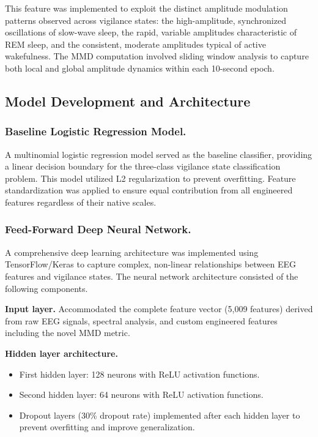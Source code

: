 \documentclass[letterpaper]{article} %
\begin{document}
This feature was implemented to exploit the distinct amplitude modulation patterns observed across vigilance states: the high-amplitude, synchronized oscillations of slow-wave sleep, the rapid, variable amplitudes characteristic of REM sleep, and the consistent, moderate amplitudes typical of active wakefulness. The MMD computation involved sliding window analysis to capture both local and global amplitude dynamics within each 10-second epoch.

\subsection{Model Development and Architecture}

\subsubsection{Baseline Logistic Regression Model.}
A multinomial logistic regression model served as the baseline classifier, providing a linear decision boundary for the three-class vigilance state classification problem. This model utilized L2 regularization to prevent overfitting. Feature standardization was applied to ensure equal contribution from all engineered features regardless of their native scales.

\subsubsection{Feed-Forward Deep Neural Network.}
A comprehensive deep learning architecture was implemented using TensorFlow/Keras to capture complex, non-linear relationships between EEG features and vigilance states. The neural network architecture consisted of the following components.

\textbf{Input layer.} Accommodated the complete feature vector (5,009 features) derived from raw EEG signals, spectral analysis, and custom engineered features including the novel MMD metric.

\textbf{Hidden layer architecture.}
\begin{itemize}\itemsep2pt\parskip0pt
    \item First hidden layer: 128 neurons with ReLU activation functions.
    \item Second hidden layer: 64 neurons with ReLU activation functions.
    \item Dropout layers (30\% dropout rate) implemented after each hidden layer to prevent overfitting and improve generalization.
\end{itemize}
\end{document}
